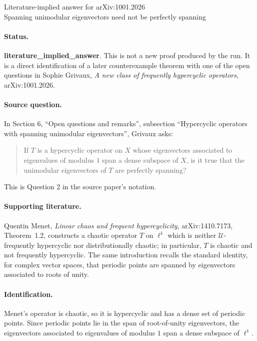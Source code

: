 \documentclass[11pt]{article}
\begin{document}
\begin{center}
{\Large Literature-implied answer for arXiv:1001.2026}\\[4pt]
{\large Spanning unimodular eigenvectors need not be perfectly spanning}
\end{center}

\paragraph{Status.}
\textbf{literature\_implied\_answer}.  This is not a new proof produced by the
run.  It is a direct identification of a later counterexample theorem with one
of the open questions in Sophie Grivaux, \emph{A new class of frequently
hypercyclic operators}, arXiv:1001.2026.

\paragraph{Source question.}
In Section 6, ``Open questions and remarks'', subsection ``Hypercyclic
operators with spanning unimodular eigenvectors'', Grivaux asks:
\begin{quote}
If $T$ is a hypercyclic operator on $X$ whose eigenvectors associated to
eigenvalues of modulus $1$ span a dense subspace of $X$, is it true that the
unimodular eigenvectors of $T$ are perfectly spanning?
\end{quote}
This is Question 2 in the source paper's notation.

\paragraph{Supporting literature.}
Quentin Menet, \emph{Linear chaos and frequent hypercyclicity},
arXiv:1410.7173, Theorem~1.2, constructs a chaotic operator $T$ on $\ell^1$
which is neither $\mathcal U$-frequently hypercyclic nor distributionally
chaotic; in particular, $T$ is chaotic and not frequently hypercyclic.  The
same introduction recalls the standard identity, for complex vector spaces,
that periodic points are spanned by eigenvectors associated to roots of unity.

\paragraph{Identification.}
Menet's operator is chaotic, so it is hypercyclic and has a dense set of
periodic points.  Since periodic points lie in the span of root-of-unity
eigenvectors, the eigenvectors associated to eigenvalues of modulus $1$ span a
dense subspace of $\ell^1$.
\end{document}
